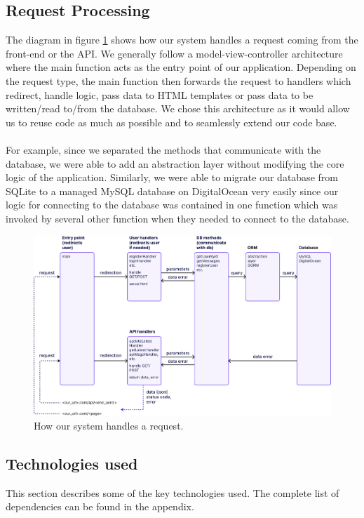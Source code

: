 \documentclass{article}
\begin{document}
\subsection{Request Processing}
The diagram in figure \ref{fig:request_pipeline} shows how our system handles a request coming from the front-end or the API. We generally follow a model-view-controller architecture where the main function acts as the entry point of our application. Depending on the request type, the main function then forwards the request to handlers which redirect, handle logic, pass data to HTML templates or pass data to be written/read to/from the database. We chose this architecture as it would allow us to reuse code as much as possible and to seamlessly extend our code base. 
\\\\
For example, since we separated the methods that communicate with the database, we were able to add an abstraction layer without modifying the core logic of the application. Similarly, we were able to migrate our database from SQLite to a managed MySQL database on DigitalOcean very easily since our logic for connecting to the database was contained in one function which was invoked by several other function when they needed to connect to the database.

\begin{figure}[ht]
    \centering
    \includegraphics[width=1.0\textwidth]{./images/request_pipeline_v2.png}
    \caption{How our system handles a request.}
    \label{fig:request_pipeline}
\end{figure}

\subsection{Technologies used}
This section describes some of the key technologies used. The complete list of dependencies can be found in the appendix.
\end{document}
